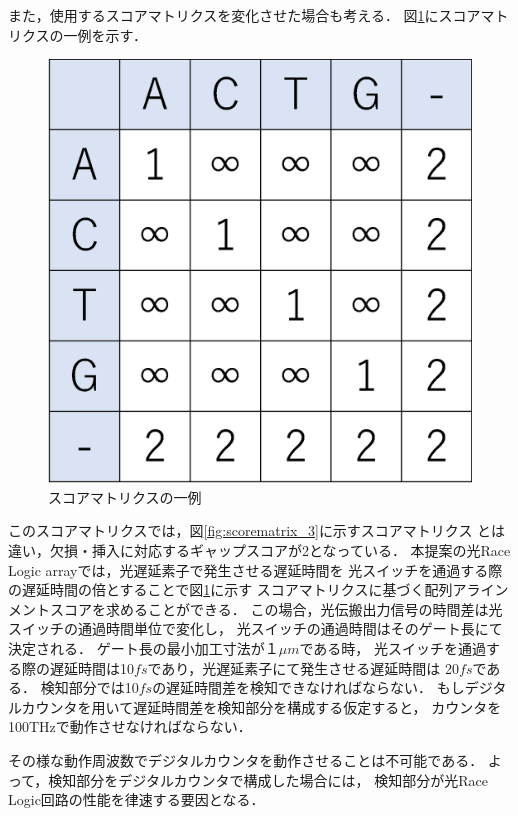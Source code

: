 また，使用するスコアマトリクスを変化させた場合も考える．
図\ref{fig:scorematrix_4}にスコアマトリクスの一例を示す．
\begin{figure}[t!]
\begin{center}
\includegraphics[keepaspectratio,scale=0.4]{fig/5/scorematrix_4.eps}
\caption{スコアマトリクスの一例}
\label{fig:scorematrix_4}
\end{center}
\end{figure}
このスコアマトリクスでは，図\ref{fig:scorematrix_3}に示すスコアマトリクス
とは違い，欠損・挿入に対応するギャップスコアが2となっている．
本提案の光Race Logic arrayでは，光遅延素子で発生させる遅延時間を
光スイッチを通過する際の遅延時間の倍とすることで図\ref{fig:scorematrix_4}に示す
スコアマトリクスに基づく配列アラインメントスコアを求めることができる．
この場合，光伝搬出力信号の時間差は光スイッチの通過時間単位で変化し，
光スイッチの通過時間はそのゲート長にて決定される．
ゲート長の最小加工寸法が１$\mu m$である時，
光スイッチを通過する際の遅延時間は10$fs$であり，光遅延素子にて発生させる遅延時間は
20$fs$である．
検知部分では10$fs$の遅延時間差を検知できなければならない．
もしデジタルカウンタを用いて遅延時間差を検知部分を構成する仮定すると，
カウンタを100THzで動作させなければならない．

その様な動作周波数でデジタルカウンタを動作させることは不可能である．
よって，検知部分をデジタルカウンタで構成した場合には，
検知部分が光Race Logic回路の性能を律速する要因となる．


